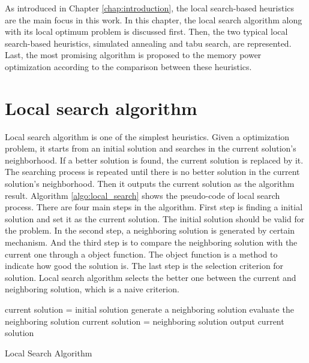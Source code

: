 \label{chap:algorithm_selection}
As introduced in Chapter \ref{chap:introduction}, the local search-based heuristics are the main focus in this work.
In this chapter, the local search algorithm along with its local optimum problem is discussed first. Then, the two typical
local search-based heuristics, simulated annealing and tabu search, are represented. Last, the most promising algorithm is
proposed to the memory power optimization according to the comparison between these heuristics.

	\section{Local search algorithm}
	\label{sec:local_search}
	Local search algorithm is one of the simplest heuristics. Given a optimization problem, it starts from an initial solution
	and searches in the current solution's neighborhood. If a better solution is found, the current solution is replaced by it. 
	The searching process is repeated until there is no better solution in the current solution's neighborhood. Then it outputs 
	the current solution as the algorithm result.
	Algorithm \ref{algo:local_search} shows the pseudo-code of local search process. There are four main steps in the algorithm.
	First step is finding a initial solution and set it as the current solution. The initial solution should be valid for the problem.
	In the second step, a neighboring solution is generated by certain mechanism. And the third step is to compare the neighboring
	solution with the current one through a object function. The object function is a method to indicate how good the solution is.
	The last step is the selection criterion for solution. Local search algorithm selects the better one between the current and neighboring solution, which is a naive criterion.
		
	\begin{algorithm2e}[H]
	current solution = initial solution\;
	{
		generate a neighboring solution\;
		evaluate the neighboring solution\;
		{
			current solution = neighboring solution\;
		}
	}
	output current solution\;
	\caption{Local Search Algorithm}
	\label{algo:local_search}
	\end{algorithm2e}
	
